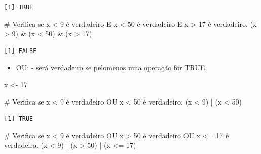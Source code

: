 \documentclass[
  letterpaper,
  DIV=11,
  numbers=noendperiod]{scrreprt}
\newenvironment{Shaded}{\begin{snugshade}}{\end{snugshade}}
\newcommand{\CommentTok}[1]{\textcolor[rgb]{0.37,0.37,0.37}{#1}}
\newcommand{\DecValTok}[1]{\textcolor[rgb]{0.68,0.00,0.00}{#1}}
\newcommand{\NormalTok}[1]{\textcolor[rgb]{0.00,0.23,0.31}{#1}}
\newcommand{\OtherTok}[1]{\textcolor[rgb]{0.00,0.23,0.31}{#1}}
\newcommand{\SpecialCharTok}[1]{\textcolor[rgb]{0.37,0.37,0.37}{#1}}
\providecommand{\tightlist}{%
  \setlength{\itemsep}{0pt}\setlength{\parskip}{0pt}}\usepackage{longtable,booktabs,array}
\begin{document}
\begin{verbatim}
[1] TRUE
\end{verbatim}

\begin{Shaded}
\begin{Highlighting}[]
\CommentTok{\# Verifica se x \textless{} 9 é verdadeiro E x \textless{} 50 é verdadeiro E x \textgreater{} 17 é verdadeiro.}
\NormalTok{(x }\SpecialCharTok{\textgreater{}} \DecValTok{9}\NormalTok{) }\SpecialCharTok{\&}\NormalTok{ (x }\SpecialCharTok{\textless{}} \DecValTok{50}\NormalTok{) }\SpecialCharTok{\&}\NormalTok{ (x }\SpecialCharTok{\textgreater{}} \DecValTok{17}\NormalTok{)}
\end{Highlighting}
\end{Shaded}

\begin{verbatim}
[1] FALSE
\end{verbatim}

\begin{itemize}
\tightlist
\item
  OU: \textbar{} - será verdadeiro se pelomenos uma operação for TRUE.
\end{itemize}

\begin{Shaded}
\begin{Highlighting}[]
\NormalTok{x }\OtherTok{\textless{}{-}} \DecValTok{17}

\CommentTok{\# Verifica se x \textless{} 9 é verdadeiro OU x \textless{} 50 é verdadeiro.}
\NormalTok{(x }\SpecialCharTok{\textless{}} \DecValTok{9}\NormalTok{) }\SpecialCharTok{|}\NormalTok{ (x }\SpecialCharTok{\textless{}} \DecValTok{50}\NormalTok{)}
\end{Highlighting}
\end{Shaded}

\begin{verbatim}
[1] TRUE
\end{verbatim}

\begin{Shaded}
\begin{Highlighting}[]
\CommentTok{\# Verifica se x \textless{} 9 é verdadeiro OU x \textgreater{} 50 é verdadeiro OU x \textless{}= 17 é verdadeiro.}
\NormalTok{(x }\SpecialCharTok{\textless{}} \DecValTok{9}\NormalTok{) }\SpecialCharTok{|}\NormalTok{ (x }\SpecialCharTok{\textgreater{}} \DecValTok{50}\NormalTok{) }\SpecialCharTok{|}\NormalTok{ (x }\SpecialCharTok{\textless{}=} \DecValTok{17}\NormalTok{)}
\end{Highlighting}
\end{Shaded}
\end{document}
